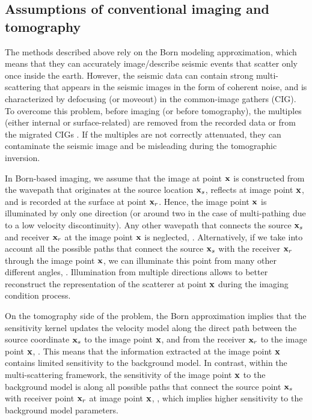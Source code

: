 \subsection{Assumptions of conventional imaging and tomography}

The methods described above rely on the Born modeling approximation,
which means that they can accurately image/describe seismic events
that scatter only once inside the earth. However, the seismic data
can contain strong multi-scattering that appears in the seismic
images in the form of coherent noise, and is characterized by
defocusing (or moveout) in the common-image gathers (CIG). To
overcome this problem, before imaging (or before tomography), the
multiples (either internal or surface-related) are removed from the
recorded data \citep{SRME,ArtWeiglein,guitton2005,Herrmann} or from
the migrated CIGs \citep{SavaGuitton,Wang,Weibull}. If the multiples
are not correctly attenuated, they can contaminate the seismic image
and be misleading during the tomographic inversion.

In Born-based imaging, we assume that the image at point ${\bf x}$ is
constructed from the wavepath that originates at the source location
${\bf x}_s$, reflects at image point ${\bf x}$, and is recorded at the
surface at point ${\bf x}_r$. Hence, the image point ${\bf x}$ is illuminated
by only one direction (or around two in the case of multi-pathing due
to a low velocity discontinuity). Any other wavepath that connects
the source ${\bf x}_s$ and receiver ${\bf x}_r$ at the image point ${\bf x}$ is
neglected, . Alternatively, if we take into account
all the possible paths that connect the source ${\bf x}_s$ with the
receiver ${\bf x}_r$ through the image point ${\bf x}$, we can illuminate
this point from many other different angles, .
Illumination from multiple directions allows to better reconstruct
the representation of the scatterer at point ${\bf x}$ during the imaging
condition process.

On the tomography side of the problem, the Born approximation implies
that the sensitivity kernel updates the velocity model along the
direct path between the source coordinate ${\bf x}_s$ to the image point
${\bf x}$, and from the receiver ${\bf x}_r$ to the image point ${\bf x}$,
. This means that the information extracted at the
image point ${\bf x}$ contains limited sensitivity to the background
model. In contrast, within the multi-scattering framework, the
sensitivity of the image point ${\bf x}$ to the background model is
along all possible paths that connect the source point ${\bf x}_s$ with
receiver point ${\bf x}_r$ at image point ${\bf x}$, , which
implies higher sensitivity to the background model parameters.

